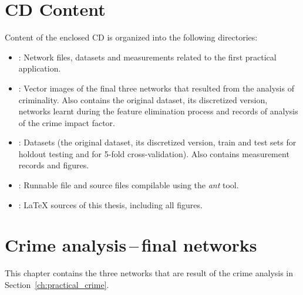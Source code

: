 





\chapter{CD Content}
Content of the enclosed CD is organized into the following directories:
\begin{itemize}
    \item {}: Network  files, datasets and measurements related to the first practical application.
    \item {}: Vector images of the final three networks that resulted from the analysis of criminality. Also contains the original dataset, its discretized version, networks learnt during the feature elimination process and records of analysis of the crime impact factor.
    \item {}: Datasets (the original dataset, its discretized version, train and test sets for holdout testing and for 5-fold cross-validation). Also contains measurement records and figures.
    \item {}: Runnable  file and source files compilable using the \emph{ant} tool.
    \item {}:  {\LaTeX} sources of this thesis, including all figures.
\end{itemize} 





\chapter{Crime analysis\,--\,final networks}\label{ch:appendix_crime_net}
This chapter contains the three networks that are result of the crime analysis in Section~\ref{ch:practical_crime}.



